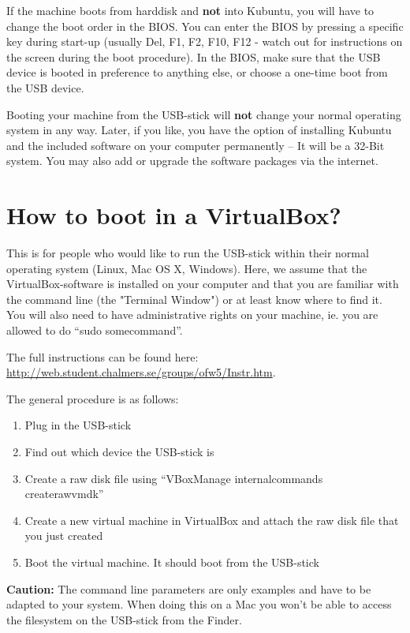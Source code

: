 \documentclass[11pt,a4paper,twocolumn]{article}
\begin{document}
If the machine boots from harddisk and {\bf not} into Kubuntu, you will have to
change the boot order in the BIOS.  You can enter the BIOS by pressing a
specific key during start-up (usually Del, F1, F2, F10, F12 - watch out for
instructions on the screen during the boot procedure).  In the BIOS, make sure
that the USB device is booted in preference to anything else, or choose a
one-time boot from the USB device.

Booting your machine from the USB-stick will {\bf not} change your normal
operating system in any way. Later, if you like, you have the option of
installing Kubuntu and the included software on your computer permanently -- It
will be a 32-Bit system.  You may also add or upgrade the software packages via
the internet.

\section{How to boot in a VirtualBox?}

This is for people who would like to run the USB-stick within their normal
operating system (Linux, Mac OS X, Windows). Here, we assume that the
VirtualBox-software is installed on your computer and that you are familiar with
the command line (the "Terminal Window") or at least know where to find it. You
will also need to have administrative rights on your machine, ie. you are
allowed to do ``sudo somecommand''.
\begin{latexonly}
The full instructions can be found here:
\href{http://web.student.chalmers.se/groups/ofw5/Instr.htm}{http://web.student.chalmers.se/groups/ofw5/Instr.htm}.
\end{latexonly}
\begin{htmlonly}
The general procedure is as follows:
%
\begin{enumerate}
\item Plug in the USB-stick
\item Find out which device the USB-stick is
\item Create a raw disk file using ``VBoxManage internalcommands
  createrawvmdk''
\item Create a new virtual machine in VirtualBox and attach the raw disk file
  that you just created
\item Boot the virtual machine. It should boot from the USB-stick
\end{enumerate}
%
{\bf Caution:} The command line parameters are only examples and have to be
adapted to your system. When doing this on a Mac you won't be able to access the
filesystem on the USB-stick from the Finder.
\end{htmlonly}
\end{document}
